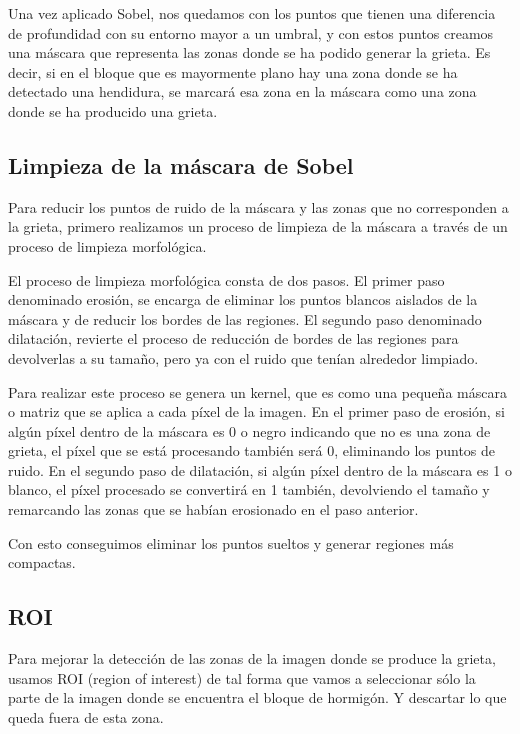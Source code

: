 Una vez aplicado Sobel, nos quedamos con los puntos que tienen una diferencia de profundidad con su entorno mayor a un umbral, y con estos puntos creamos una máscara que representa las zonas donde se ha podido generar la grieta. Es decir, si en el bloque que es mayormente plano hay una zona donde se ha detectado una hendidura, se marcará esa zona en la máscara como una zona donde se ha producido una grieta.


\subsection{Limpieza de la máscara de Sobel}
Para reducir los puntos de ruido de la máscara y las zonas que no corresponden a la grieta, primero realizamos un proceso de limpieza de la máscara a través de un proceso de limpieza morfológica.

El proceso de limpieza morfológica consta de dos pasos. El primer paso denominado erosión, se encarga de eliminar los puntos blancos aislados de la máscara y de reducir los bordes de las regiones. El segundo paso denominado dilatación, revierte el proceso de reducción de bordes de las regiones para devolverlas a su tamaño, pero ya con el ruido que tenían alrededor limpiado.

Para realizar este proceso se genera un kernel, que es como una pequeña máscara o matriz que se aplica a cada píxel de la imagen. En el primer paso de erosión, si algún píxel dentro de la máscara es 0 o negro indicando que no es una zona de grieta, el píxel que se está procesando también será 0, eliminando los puntos de ruido. En el segundo paso de dilatación, si algún píxel dentro de la máscara es 1 o blanco, el píxel procesado se convertirá en 1 también, devolviendo el tamaño y remarcando las zonas que se habían erosionado en el paso anterior.

Con esto conseguimos eliminar los puntos sueltos y generar regiones más compactas.

\subsection{ROI}
Para mejorar la detección de las zonas de la imagen donde se produce la grieta, usamos ROI (region of interest) de tal forma que vamos a seleccionar sólo la parte de la imagen donde se encuentra el bloque de hormigón. Y descartar lo que queda fuera de esta zona.

